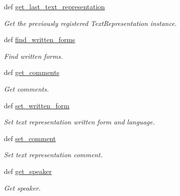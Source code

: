 \begin{DoxyCompactItemize}
def \hyperlink{classlmf_1_1src_1_1mrd_1_1context_1_1_context_a89ae6b79b719e165e5773b2035eb2ded}{get\+\_\+last\+\_\+text\+\_\+representation}
\begin{DoxyCompactList}\small\item\em Get the previously registered Text\+Representation instance. \end{DoxyCompactList}\item 
def \hyperlink{classlmf_1_1src_1_1mrd_1_1context_1_1_context_a4969405d9d78799039adce3919656fcf}{find\+\_\+written\+\_\+forms}
\begin{DoxyCompactList}\small\item\em Find written forms. \end{DoxyCompactList}\item 
def \hyperlink{classlmf_1_1src_1_1mrd_1_1context_1_1_context_a822729925a426c3ea85d6d4206c059c7}{get\+\_\+comments}
\begin{DoxyCompactList}\small\item\em Get comments. \end{DoxyCompactList}\item 
def \hyperlink{classlmf_1_1src_1_1mrd_1_1context_1_1_context_a5c25980cacb6a7268fc6144ee464ff51}{set\+\_\+written\+\_\+form}
\begin{DoxyCompactList}\small\item\em Set text representation written form and language. \end{DoxyCompactList}\item 
def \hyperlink{classlmf_1_1src_1_1mrd_1_1context_1_1_context_aea5b1870d2e818c89ba00055e7318395}{set\+\_\+comment}
\begin{DoxyCompactList}\small\item\em Set text representation comment. \end{DoxyCompactList}\item 
def \hyperlink{classlmf_1_1src_1_1mrd_1_1context_1_1_context_a411ba47fe4581d2e3416b44fbd9ab1d9}{get\+\_\+speaker}
\begin{DoxyCompactList}\small\item\em Get speaker. \end{DoxyCompactList}\end{DoxyCompactItemize}
